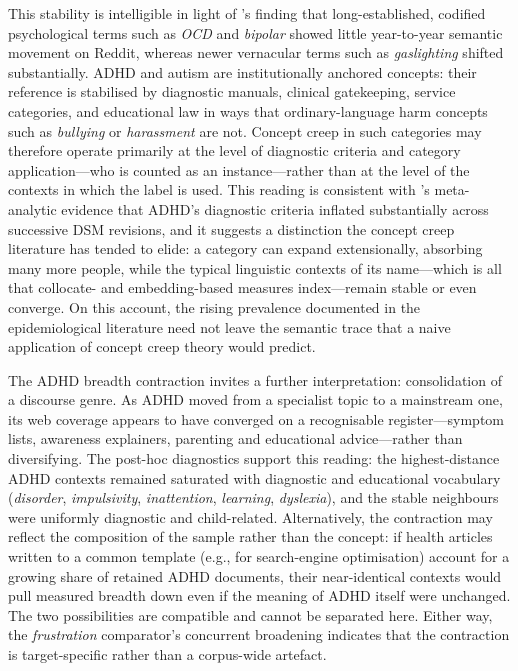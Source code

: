 This stability is intelligible in light of \citeauthor{iacobComputationalAnalysisEmergence2026}'s \citeyear{iacobComputationalAnalysisEmergence2026} finding that long-established, codified psychological terms such as \emph{OCD} and \emph{bipolar} showed little year-to-year semantic movement on Reddit, whereas newer vernacular terms such as \emph{gaslighting} shifted substantially. ADHD and autism are institutionally anchored concepts: their reference is stabilised by diagnostic manuals, clinical gatekeeping, service categories, and educational law in ways that ordinary-language harm concepts such as \emph{bullying} or \emph{harassment} \citep{vylomovaSemanticChangesHarmrelated2021} are not. Concept creep in such categories may therefore operate primarily at the level of diagnostic criteria and category application---who is counted as an instance---rather than at the level of the contexts in which the label is used. This reading is consistent with \citeauthor{fabianoDiagnosticInflationDSM2020}'s \citeyear{fabianoDiagnosticInflationDSM2020} meta-analytic evidence that ADHD's diagnostic criteria inflated substantially across successive DSM revisions, and it suggests a distinction the concept creep literature has tended to elide: a category can expand extensionally, absorbing many more people, while the typical linguistic contexts of its name---which is all that collocate- and embedding-based measures index---remain stable or even converge. On this account, the rising prevalence documented in the epidemiological literature
\citep{zeidanGlobalPrevalenceAutism2022,mckechnieAttentiondeficitHyperactivityDisorder2023,cuiDSM5ChangesCOVID192026} need not leave the semantic trace that a naive application of concept creep theory would predict.

The ADHD breadth contraction invites a further interpretation: consolidation of a discourse genre. As ADHD moved from a specialist topic to a mainstream one, its web coverage appears to have converged on a recognisable register---symptom lists, awareness explainers, parenting and educational advice---rather than diversifying. The post-hoc diagnostics support this reading: the highest-distance ADHD contexts remained saturated with diagnostic and educational vocabulary (\emph{disorder}, \emph{impulsivity}, \emph{inattention}, \emph{learning}, \emph{dyslexia}), and the stable neighbours were uniformly diagnostic and child-related. Alternatively, the contraction may reflect the composition of the sample rather than the concept: if health articles written to a common template (e.g., for search-engine optimisation) account for a growing share of retained ADHD documents, their near-identical contexts would pull measured breadth down even if the meaning of ADHD itself were unchanged. The two possibilities are compatible and cannot be separated here. Either way, the \textit{frustration} comparator's concurrent broadening indicates that the contraction is target-specific rather than a corpus-wide artefact.

